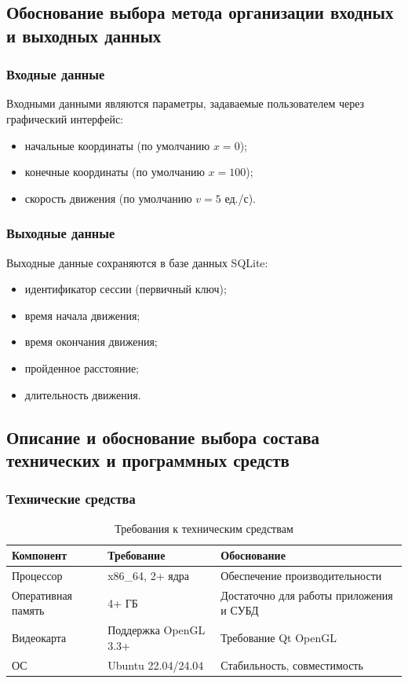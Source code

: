 \documentclass[12pt, a4paper]{article}
\begin{document}
\subsection{Обоснование выбора метода организации входных и выходных данных}

\subsubsection{Входные данные}
Входными данными являются параметры, задаваемые пользователем через графический интерфейс:
\begin{itemize}
    \item начальные координаты (по умолчанию $x=0$);
    \item конечные координаты (по умолчанию $x=100$);
    \item скорость движения (по умолчанию $v=5$ ед./с).
\end{itemize}

\subsubsection{Выходные данные}
Выходные данные сохраняются в базе данных SQLite:
\begin{itemize}
    \item идентификатор сессии (первичный ключ);
    \item время начала движения;
    \item время окончания движения;
    \item пройденное расстояние;
    \item длительность движения.
\end{itemize}

\subsection{Описание и обоснование выбора состава технических и программных средств}

\subsubsection{Технические средства}
\begin{table}[h]
    \centering
    \begin{tabular}{|p{4cm}|p{3cm}|p{8cm}|}
        \hline
        \textbf{Компонент} & \textbf{Требование} & \textbf{Обоснование} \\
        \hline
        Процессор & x86\_64, 2+ ядра & Обеспечение производительности \\
        \hline
        Оперативная память & 4+ ГБ & Достаточно для работы приложения и СУБД \\
        \hline
        Видеокарта & Поддержка OpenGL 3.3+ & Требование Qt OpenGL \\
        \hline
        ОС & Ubuntu 22.04/24.04 & Стабильность, совместимость \\
        \hline
    \end{tabular}
    \caption{Требования к техническим средствам}
\end{table}
\end{document}
